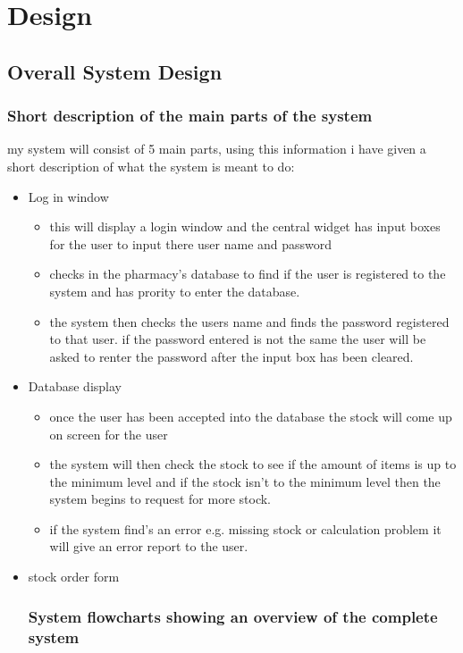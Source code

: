 \chapter{Design}

\section{Overall System Design}

\subsection{Short description of the main parts of the system}
my system will consist of 5 main parts, using this information i have given a short description of what the system is meant to do:
\begin{itemize}
\item Log in window 
\begin{itemize}
\item this will display a login window and the central widget has input boxes for the user to input there user name and password
\item checks in the pharmacy's database to find if the user is registered to the system and has prority to enter the database.
\item the system then checks the users name and finds the password registered to that user. if the password entered is not the same the user will be asked to renter the password after the input box has been cleared.
\end{itemize}
\item Database display
\begin{itemize}
\item once the user has been accepted into the database the stock will come up on screen for the user 
\item the system will then check the stock to see if the amount of items is up to the minimum level and if the stock isn't to the minimum level then the system begins to request for more stock.
\item if the system find's an error e.g. missing stock or calculation problem it will give an error report to the user.
\end{itemize}
\item stock order form
\begin{itemize}

\end{itemize}
\subsection{System flowcharts showing an overview of the complete system}


\end{itemize}
